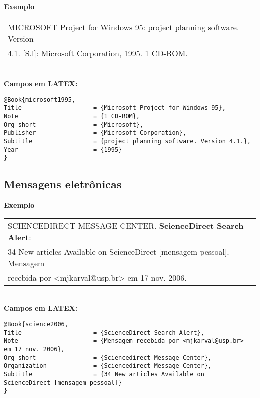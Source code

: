 \textbf{Exemplo} \\
	
\begin{tabular}{|l|c|} \hline
	MICROSOFT Project for Windows 95: project planning software. Version \\4.1. [S.l]: Microsoft Corporation, 1995. 1 CD-ROM. 
	                                                                     \\\hline
\end{tabular} \\
	
\textbf{Campos em LATEX:} 
	
\begingroup
\fontsize{10pt}{12pt}\selectfont
\begin{verbatim}
@Book{microsoft1995,
Title                    = {Microsoft Project for Windows 95},
Note                     = {1 CD-ROM},
Org-short                = {Microsoft},
Publisher                = {Microsoft Corporation},
Subtitle                 = {project planning software. Version 4.1.},
Year                     = {1995}
}
\end{verbatim}
\endgroup
	
\subsection{Mensagens eletrônicas}
	
\textbf{Exemplo} \\
	
\begin{tabular}{|l|c|} \hline
	SCIENCEDIRECT MESSAGE CENTER. \textbf{ScienceDirect Search Alert}: \\34 New articles Available on ScienceDirect [mensagem pessoal]. Mensagem \\recebida por <mjkarval@usp.br> em 17 nov. 2006. 
	                                                                   \\\hline
\end{tabular} \\
	
\textbf{Campos em LATEX:} 
	
\begingroup
\fontsize{10pt}{12pt}\selectfont
\begin{verbatim}
@Book{science2006,
Title                    = {ScienceDirect Search Alert},
Note                     = {Mensagem recebida por <mjkarval@usp.br> 
em 17 nov. 2006},
Org-short                = {Sciencedirect Message Center},
Organization             = {Sciencedirect Message Center},
Subtitle                 = {34 New articles Available on 
ScienceDirect [mensagem pessoal]}
}
\end{verbatim}
\endgroup
	